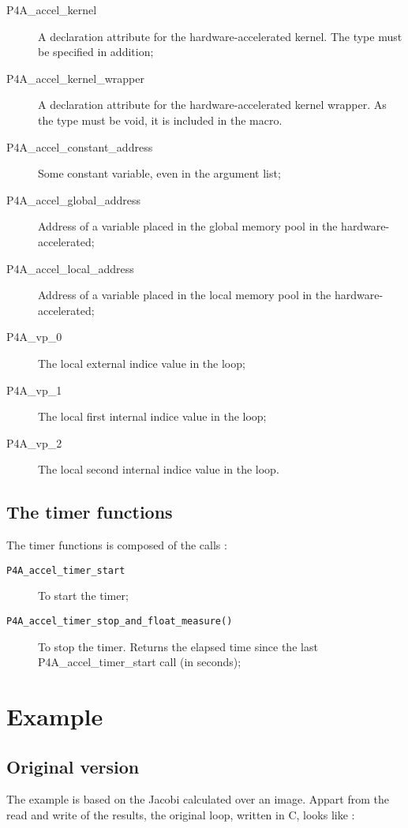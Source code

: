 \documentclass[a4paper]{article}
\begin{document}
\begin{description}
\item[P4A\_accel\_kernel] A declaration attribute for the
  hardware-accelerated kernel. The type must be specified in addition;
\item[P4A\_accel\_kernel\_wrapper] A declaration attribute for the
  hardware-accelerated kernel wrapper. As the type must be void, it is
  included in the macro.
\item[P4A\_accel\_constant\_address] Some constant variable, even in
  the argument list;
\item[P4A\_accel\_global\_address] Address of a variable placed in the global
  memory pool in the hardware-accelerated;
\item[P4A\_accel\_local\_address] Address of a variable placed in the local
  memory pool in the hardware-accelerated;
\item[P4A\_vp\_0] The local external indice value in the loop;
\item[P4A\_vp\_1] The local first internal indice value in the loop;
\item[P4A\_vp\_2] The local second internal indice value in the loop.
\end{description}

\subsection{The timer functions}

The timer functions is composed of the calls :

\begin{description}
\item[\texttt{P4A\_accel\_timer\_start}] To start the timer;
\item[\texttt{P4A\_accel\_timer\_stop\_and\_float\_measure()}] To stop
  the timer. Returns the elapsed time since the last
  P4A\_accel\_timer\_start call (in seconds);
\end{description}


\section{Example}

\subsection{Original version}
The example is based on the Jacobi calculated over an
image.  Appart from the read and write of the results, the original
loop, written in C, looks like :
\end{document}
